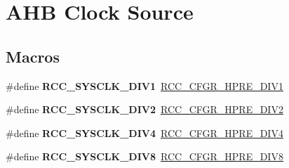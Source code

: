 \hypertarget{group___r_c_c___a_h_b___clock___source}{}\section{A\+HB Clock Source}
\label{group___r_c_c___a_h_b___clock___source}
\subsection*{Macros}
\begin{DoxyCompactItemize}
\item 
\mbox{\label{group___r_c_c___a_h_b___clock___source_ga226f5bf675015ea677868132b6b83494}} 
\#define {\bfseries R\+C\+C\+\_\+\+S\+Y\+S\+C\+L\+K\+\_\+\+D\+I\+V1}~\mbox{\hyperlink{group___peripheral___registers___bits___definition_ga2b7d7f29b09a49c31404fc0d44645c84}{R\+C\+C\+\_\+\+C\+F\+G\+R\+\_\+\+H\+P\+R\+E\+\_\+\+D\+I\+V1}}
\item 
\mbox{\label{group___r_c_c___a_h_b___clock___source_gac37c0610458a92e3cb32ec81014625c3}} 
\#define {\bfseries R\+C\+C\+\_\+\+S\+Y\+S\+C\+L\+K\+\_\+\+D\+I\+V2}~\mbox{\hyperlink{group___peripheral___registers___bits___definition_gaa9eeb5e38e53e79b08a4ac438497ebea}{R\+C\+C\+\_\+\+C\+F\+G\+R\+\_\+\+H\+P\+R\+E\+\_\+\+D\+I\+V2}}
\item 
\mbox{\label{group___r_c_c___a_h_b___clock___source_ga6fd3652d6853563cdf388a4386b9d22f}} 
\#define {\bfseries R\+C\+C\+\_\+\+S\+Y\+S\+C\+L\+K\+\_\+\+D\+I\+V4}~\mbox{\hyperlink{group___peripheral___registers___bits___definition_gaffe860867ae4b1b6d28473ded1546d91}{R\+C\+C\+\_\+\+C\+F\+G\+R\+\_\+\+H\+P\+R\+E\+\_\+\+D\+I\+V4}}
\item 
\mbox{\label{group___r_c_c___a_h_b___clock___source_ga7def31373854ba9c72bb76b1d13e3aad}} 
\#define {\bfseries R\+C\+C\+\_\+\+S\+Y\+S\+C\+L\+K\+\_\+\+D\+I\+V8}~\mbox{\hyperlink{group___peripheral___registers___bits___definition_gaca71d6b42bdb83b5ff5320578869a058}{R\+C\+C\+\_\+\+C\+F\+G\+R\+\_\+\+H\+P\+R\+E\+\_\+\+D\+I\+V8}}
\item 
\mbox{\label{group___r_c_c___a_h_b___clock___source_ga895462b261e03eade3d0139cc1327a51}} 

\end{DoxyCompactItemize}
